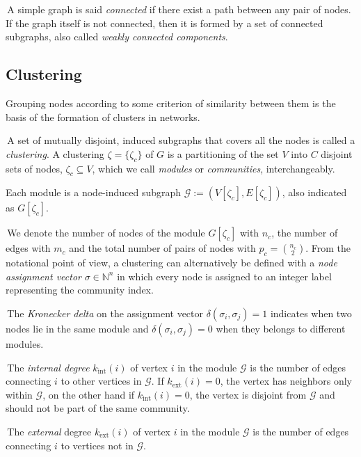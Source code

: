 \noindent\textbullet \,A simple graph is said \emph{connected} if there exist a path between any pair of nodes.
If the graph itself is not connected, then it is formed by a set of connected subgraphs, also called \emph{weakly connected components}.


\subsection{Clustering}\label{sec:clustering}
Grouping nodes according to some criterion of similarity between them is the basis of the formation of clusters in networks.

\noindent\textbullet \,A set of mutually disjoint, induced subgraphs that covers all the nodes is called a \emph{clustering}.
A clustering $\zeta = \{\zeta_c\}$ of $G$ is a partitioning of the set $V$ into $C$ disjoint sets of nodes, $\zeta_c \subseteq V$, which we call \emph{modules} or \emph{communities}, interchangeably.

Each module is a node-induced subgraph $\mathcal{G}:=(V[\zeta_c],E[\zeta_c])$, also indicated as $G[\zeta_c]$.

\noindent\textbullet \,We denote the number of nodes of the module $G[\zeta_c]$ with $n_c$, the number of edges with $m_c$ and the total number of pairs of nodes with $p_c=\binom{n_c}{2}$.
From the notational point of view, a clustering can alternatively be defined with a \emph{node assignment vector} $\sigma \in \mathbb{N}^n$ in which every node is assigned to an integer label representing the community index.


\noindent\textbullet \,The \emph{Kronecker delta} on the assignment vector $\delta(\sigma_i,\sigma_j)=1$ indicates when two nodes lie in the same module and $\delta(\sigma_i,\sigma_j)=0$ when they belongs to different modules.

\noindent\textbullet \,The \emph{internal degree} $k_{\textrm{int}}(i)$ of vertex $i$ in the module $\mathcal{G}$ is the number of edges connecting $i$ to other vertices in $\mathcal{G}$.
If $k_{\textrm{ext}}(i)=0$, the vertex has neighbors only within $\mathcal{G}$, on the other hand if $k_{\textrm{int}}(i)=0$, the vertex is disjoint from $\mathcal{G}$ and should not be part of the same community.

\noindent\textbullet \,The \emph{external} degree $k_{\textrm{ext}}(i)$ of vertex $i$ in the module $\mathcal{G}$ is the number of edges connecting $i$ to vertices not in $\mathcal{G}$.

